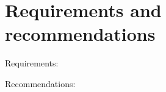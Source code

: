 \section{Requirements and recommendations}
\label{sec:spec_doc_req_and_rec}

\noindent
Requirements:
\begin{itemize}
\end{itemize}

\noindent
Recommendations:
\begin{itemize}
\end{itemize}

